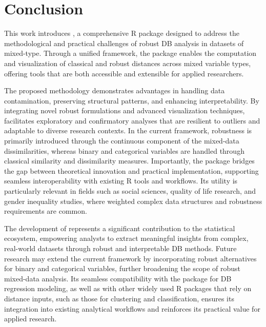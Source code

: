 \section{Conclusion}
\label{sec.conclusions}

This work introduces , a comprehensive R package designed to address the methodological and practical challenges of robust DB analysis in datasets of mixed-type. Through a unified framework, the package enables the computation and visualization of classical and robust distances across mixed variable types, offering tools that are both accessible and extensible for applied researchers.

The proposed methodology demonstrates advantages in handling data contamination, preserving structural patterns, and enhancing interpretability.
By integrating novel robust formulations and advanced visualization techniques,  facilitates exploratory and confirmatory analyses that are resilient to outliers and adaptable to diverse research contexts. In the current framework, robustness is primarily introduced through the continuous component of the mixed-data dissimilarities, whereas binary and categorical variables are handled through classical similarity and dissimilarity measures. Importantly, the package bridges the gap between theoretical innovation and practical implementation, supporting seamless interoperability with existing R tools and workflows. Its utility is particularly relevant in fields such as social sciences, quality of life research, and gender inequality studies, where weighted complex data structures and robustness requirements are common.

The development of  represents a significant contribution to the statistical ecosystem, empowering analysts to extract meaningful insights from complex, real-world datasets through robust and interpretable DB methods. Future research may extend the current framework by incorporating robust alternatives for binary and categorical variables, further broadening the scope of robust mixed-data analysis. Its seamless compatibility with the  package for DB regression modeling, as well as with other widely used R packages that rely on distance inputs, such as those for clustering and classification, ensures its integration into existing analytical workflows and reinforces its practical value for applied research.

